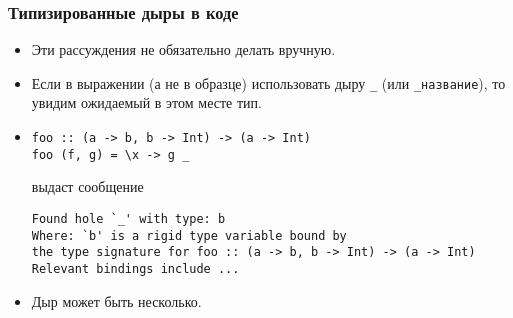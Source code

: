 \documentclass[10pt]{beamer}
\begin{document}
\begin{frame}[fragile]
\frametitle{Типизированные дыры в коде}
\begin{itemize}
    \item Эти рассуждения не обязательно делать вручную.
    \item Если в выражении (а не в образце) использовать дыру \lstinline|_| (или \lstinline|_название|), то увидим ожидаемый в этом месте тип.
    \item
\begin{lstlisting}
foo :: (a -> b, b -> Int) -> (a -> Int)
foo (f, g) = \x -> g _
\end{lstlisting}
    выдаст сообщение
\begin{lstlisting}
Found hole `_' with type: b
Where: `b' is a rigid type variable bound by
the type signature for foo :: (a -> b, b -> Int) -> (a -> Int)
Relevant bindings include ...
\end{lstlisting}
    \item Дыр может быть несколько.
\end{itemize}
\end{frame}
\end{document}
